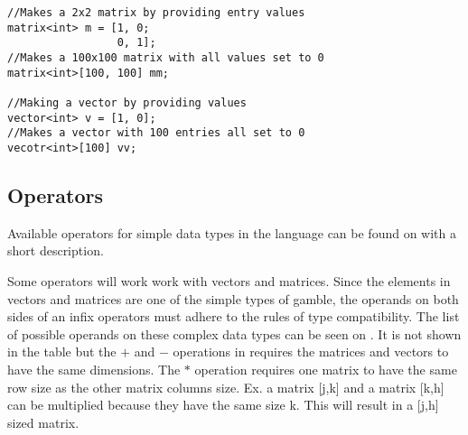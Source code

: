 \begin{lstlisting}[caption={Syntax for creating a matrix or vector},label={lst:matrix},numbers=none]
//Makes a 2x2 matrix by providing entry values
matrix<int> m = [1, 0; 
                 0, 1];
//Makes a 100x100 matrix with all values set to 0
matrix<int>[100, 100] mm;

//Making a vector by providing values
vector<int> v = [1, 0];
//Makes a vector with 100 entries all set to 0
vecotr<int>[100] vv;
\end{lstlisting}

\subsection*{Operators}
Available operators for simple data types in the language can be found on  with a short description.  


Some operators will work work with vectors and matrices.
Since the elements in vectors and matrices are one of the simple types of \gls{gamble}, the operands on both sides of an infix operators must adhere to the rules of type compatibility.
The list of possible operands on these complex data types can be seen on .
 It is not shown in the table but the $+$ and $-$ operations in  requires the matrices and vectors to have the same dimensions.
 The $*$ operation requires one matrix to have the same row size as the other matrix columns size. Ex. a matrix [j,k] and a matrix [k,h] can be multiplied because they have the same size k.
 This will result in a [j,h] sized matrix.


